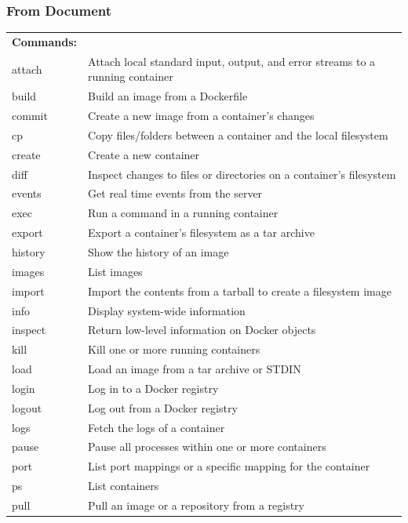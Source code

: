 \documentclass[a4paper]{article}
\begin{document}
{\begin{tabular} { >{\ttfamily}l  }
	\end{tabular}
}
\subsubsection{From Document}
\small {
\begin{tabular} { >{\ttfamily}l  p{10cm} }
\textbf{Commands:} & \\
	attach    &  Attach local standard input, output, and error streams to a running container \\
	build     &  Build an image from a Dockerfile \\
	commit    &  Create a new image from a container's changes \\
	cp        &  Copy files/folders between a container and the local filesystem \\
	create    &  Create a new container \\
	diff      &  Inspect changes to files or directories on a container's filesystem \\
	events    &  Get real time events from the server \\
	exec      &  Run a command in a running container \\
	export    &  Export a container's filesystem as a tar archive \\
	history   &  Show the history of an image \\
	images    &  List images \\
	import    &  Import the contents from a tarball to create a filesystem image \\
	info      &  Display system-wide information \\
	inspect   &  Return low-level information on Docker objects \\
	kill      &  Kill one or more running containers \\
	load      &  Load an image from a tar archive or STDIN \\
	login     &  Log in to a Docker registry \\
	logout    &  Log out from a Docker registry \\
	logs      &  Fetch the logs of a container \\
	pause     &  Pause all processes within one or more containers \\
	port      &  List port mappings or a specific mapping for the container \\
	ps        &  List containers \\
	pull      &  Pull an image or a repository from a registry \\

\end{tabular}}
\end{document}
